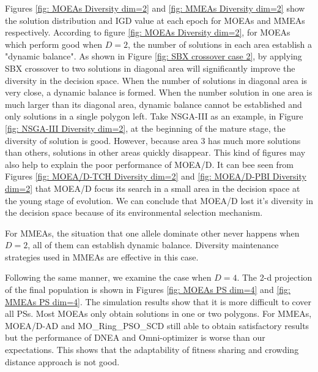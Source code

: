 \documentclass[conference]{IEEEtran}
\begin{document}
Figures \ref{fig: MOEAs Diversity dim=2} and \ref{fig: MMEAs Diversity dim=2} show the solution distribution and IGD value at each epoch for MOEAs and MMEAs respectively. According to figure \ref{fig: MOEAs Diversity dim=2}, for MOEAs which perform good when $D=2$, the number of solutions in each area establish a "dynamic balance". As shown in Figure \ref{fig: SBX crossover case 2}, by applying SBX crossover to two solutions in diagonal area will significantly improve the diversity in the decision space. When the number of solutions in diagonal area is very close, a dynamic balance is formed. When the number solution in one area is much larger than its diagonal area, dynamic balance cannot be established and only solutions in a single polygon left. Take NSGA-III as an example, in Figure \ref{fig: NSGA-III Diversity dim=2}, at the beginning of the mature stage, the diversity of solution is good. However, because area 3 has much more solutions than others, solutions in other areas quickly disappear. This kind of figures may also help to explain the poor performance of MOEA/D. It can bee seen from Figures \ref{fig: MOEA/D-TCH Diversity dim=2} and \ref{fig: MOEA/D-PBI Diversity dim=2} that MOEA/D focus its search in a small area in the decision space at the young stage of evolution. We can conclude that MOEA/D lost it's diversity in the decision space because of its environmental selection mechanism.

For MMEAs, the situation that one allele dominate other never happens when $D=2$, all of them can establish dynamic balance. Diversity maintenance strategies used in MMEAs are effective in this case.

Following the same manner, we examine the case when $D=4$. The 2-d projection of the final population is shown in Figures \ref{fig: MOEAs PS dim=4} and \ref{fig: MMEAs PS dim=4}. The simulation results show that it is more difficult to cover all PSs. Most MOEAs only obtain solutions in one or two polygons. For MMEAs, MOEA/D-AD and MO\_Ring\_PSO\_SCD still able to obtain satisfactory results but the performance of DNEA and Omni-optimizer is worse than our expectations. This shows that the adaptability of fitness sharing and crowding distance approach is not good. 
\end{document}
